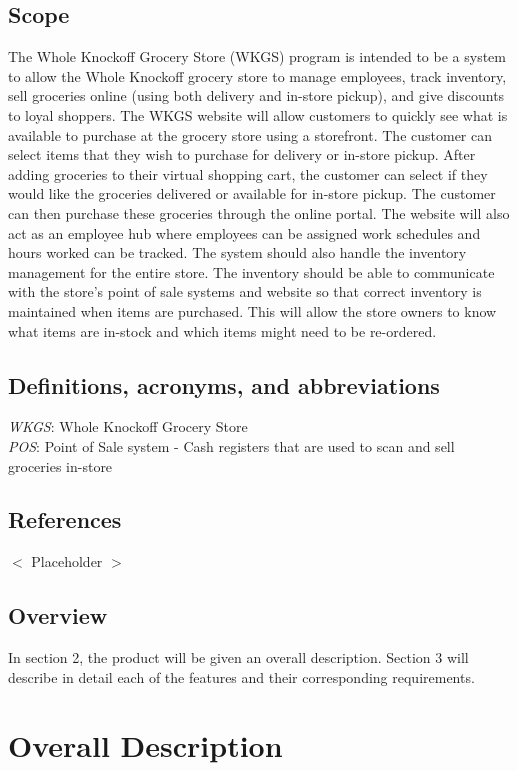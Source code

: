 \documentclass{scrreprt}
\theoremstyle{funreq}
\begin{document}
\section{Scope}
The Whole Knockoff Grocery Store (WKGS) program is intended to be a system to allow the Whole Knockoff grocery store to manage employees, track inventory, sell groceries online (using both delivery and in-store pickup), and give discounts to loyal shoppers.  The WKGS website will allow customers to quickly see what is available to purchase at the grocery store using a storefront.  The customer can select items that they wish to purchase for delivery or in-store pickup.  After adding groceries to their virtual shopping cart, the customer can select if they would like the groceries delivered or available for in-store pickup.  The customer can then purchase these groceries through the online portal.  The website will also act as an employee hub where employees can be assigned work schedules and hours worked can be tracked.  The system should also handle the inventory management for the entire store.  The inventory should be able to communicate with the store's point of sale systems and website so that correct inventory is maintained when items are purchased.  This will allow the store owners to know what items are in-stock and which items might need to be re-ordered.

\section{Definitions, acronyms, and abbreviations}
\textit{WKGS}: Whole Knockoff Grocery Store\\
\textit{POS}: Point of Sale system - Cash registers that are used to scan and sell groceries in-store\\


\section{References}
$<$ Placeholder $>$

\section{Overview}
In section 2, the product will be given an overall description.  Section 3 will describe in detail each of the features and their corresponding requirements.   

{\let\clearpage\relax 
\chapter{Overall Description}}
\end{document}
